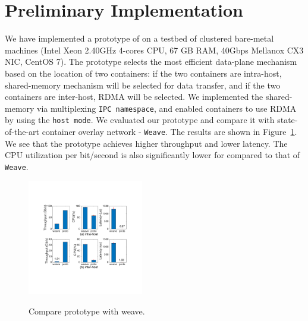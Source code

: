 \section{Preliminary Implementation} \label{sec:implementation}

We have implemented a prototype of \sysname on a testbed of clustered bare-metal
machines (Intel Xeon 2.40GHz 4-cores CPU, 67 GB RAM, 40Gbps Mellanox CX3 NIC,
CentOS 7). The prototype selects the most efficient data-plane mechanism based
on the location of two containers: if the two containers are intra-host,
shared-memory mechanism will be selected for data transfer, and if the two
containers are inter-host, RDMA will be selected.  We implemented the
shared-memory via multiplexing \texttt{IPC namespace}, and enabled containers to
use RDMA by using the \texttt{host mode}.  We evaluated our prototype and
compare it with state-of-the-art container overlay network - \texttt{Weave}. The
results are shown in Figure~\ref{fig:sys_eval_proto}. We see that the \sysname
prototype achieves higher throughput and lower latency. The CPU utilization per
bit/second is also significantly lower for \sysname compared to that of
\texttt{Weave}. 

\begin{figure}[ht]
\centering 
\includegraphics[width=0.45\textwidth]{figures/system/eval_proto.pdf}
\label{fig:sys_eval_proto}
\caption{Compare \sysname prototype with weave.} 
\end{figure}


